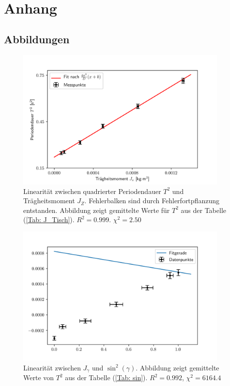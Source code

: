 \section{Anhang}
	\subsection{Abbildungen}
	\begin{figure}[!ht]
		\centering									%
		\includegraphics[width=300pt]{fotos/gpr1/Regression_M2_J_Tisch.png}			%
		\caption{Linearität zwischen quadrierter Periodendauer $ T^{2} $ und Trägheitsmoment $ J_{Z} $. Fehlerbalken sind durch Fehlerfortpflanzung entstanden. Abbildung zeigt gemittelte Werte für $ T^{2} $ aus der Tabelle (\ref{Tab: J_Tisch}). $ R^{2}=0.999 $. $ \chi^{2}=2.50 $ }							%
		\label{Abb.: J_Z}							%
	\end{figure}

\begin{figure}[!ht]
	\centering									%
	\includegraphics[width=300pt]{fotos/gpr1/Regression_Zylinder.png}			%
	\caption{Linearität zwischen $ J_{\gamma} $ und $ \sin^{2}(\gamma) $. Abbildung zeigt gemittelte Werte von $ T^{2} $ aus der Tabelle (\ref{Tab: sin}). $ R^{2}=0.992 $, $ \chi^{2}=6164.4 $ }							%
	\label{Abb.: gam}							%
\end{figure}
	